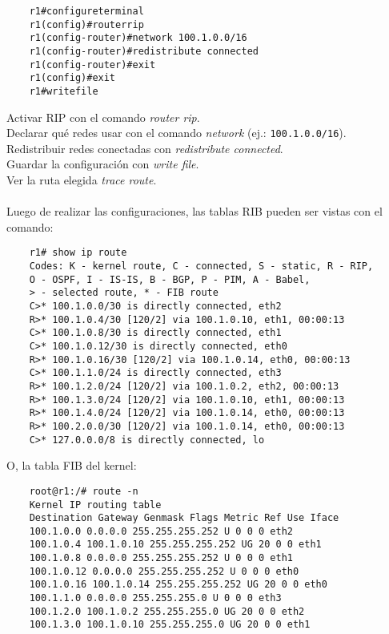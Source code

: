 \documentclass{article}
\begin{document}
\begin{lstlisting}
    r1#configureterminal
    r1(config)#routerrip
    r1(config-router)#network 100.1.0.0/16
    r1(config-router)#redistribute connected
    r1(config-router)#exit
    r1(config)#exit
    r1#writefile
\end{lstlisting}

     Activar RIP con el comando \textit{router rip}.\\
     Declarar qué redes usar con el comando \textit{network} (ej.: \verb|100.1.0.0/16|).\\
     Redistribuir redes conectadas con \textit{redistribute connected}.\\
     Guardar la configuración con \textit{write file}.\\
     Ver la ruta elegida \textit{trace route}. \\\\

Luego de realizar las configuraciones, las tablas RIB pueden ser vistas con el comando:
\begin{lstlisting}
    r1# show ip route
    Codes: K - kernel route, C - connected, S - static, R - RIP,
    O - OSPF, I - IS-IS, B - BGP, P - PIM, A - Babel,
    > - selected route, * - FIB route
    C>* 100.1.0.0/30 is directly connected, eth2
    R>* 100.1.0.4/30 [120/2] via 100.1.0.10, eth1, 00:00:13
    C>* 100.1.0.8/30 is directly connected, eth1
    C>* 100.1.0.12/30 is directly connected, eth0
    R>* 100.1.0.16/30 [120/2] via 100.1.0.14, eth0, 00:00:13
    C>* 100.1.1.0/24 is directly connected, eth3
    R>* 100.1.2.0/24 [120/2] via 100.1.0.2, eth2, 00:00:13
    R>* 100.1.3.0/24 [120/2] via 100.1.0.10, eth1, 00:00:13
    R>* 100.1.4.0/24 [120/2] via 100.1.0.14, eth0, 00:00:13
    R>* 100.2.0.0/30 [120/2] via 100.1.0.14, eth0, 00:00:13
    C>* 127.0.0.0/8 is directly connected, lo
\end{lstlisting}
O, la tabla FIB del kernel:
\begin{lstlisting}
    root@r1:/# route -n
    Kernel IP routing table
    Destination Gateway Genmask Flags Metric Ref Use Iface
    100.1.0.0 0.0.0.0 255.255.255.252 U 0 0 0 eth2
    100.1.0.4 100.1.0.10 255.255.255.252 UG 20 0 0 eth1
    100.1.0.8 0.0.0.0 255.255.255.252 U 0 0 0 eth1
    100.1.0.12 0.0.0.0 255.255.255.252 U 0 0 0 eth0
    100.1.0.16 100.1.0.14 255.255.255.252 UG 20 0 0 eth0
    100.1.1.0 0.0.0.0 255.255.255.0 U 0 0 0 eth3
    100.1.2.0 100.1.0.2 255.255.255.0 UG 20 0 0 eth2
    100.1.3.0 100.1.0.10 255.255.255.0 UG 20 0 0 eth1   
\end{lstlisting}
\end{document}
